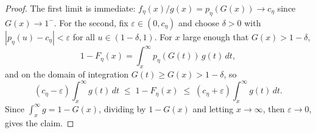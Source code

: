 \documentclass[10pt,a4paper]{amsart}
\begin{document}
\begin{proof}
The first limit is immediate: $f_\eta(x)/g(x)=p_\eta(G(x))\to c_\eta$
since $G(x)\to1^-$. For the second, fix $\varepsilon\in(0,c_\eta)$ and
choose $\delta>0$ with $|p_\eta(u)-c_\eta|<\varepsilon$ for all
$u\in(1-\delta,1)$. For $x$ large enough that $G(x)>1-\delta$,
\[
1-F_\eta(x)=\int_x^\infty p_\eta(G(t))\,g(t)\,dt,
\]
and on the domain of integration $G(t)\ge G(x)>1-\delta$, so
\[
(c_\eta-\varepsilon)\int_x^\infty g(t)\,dt
\;\le\;
1-F_\eta(x)
\;\le\;
(c_\eta+\varepsilon)\int_x^\infty g(t)\,dt .
\]
Since $\int_x^\infty g=1-G(x)$, dividing by $1-G(x)$ and letting
$x\to\infty$, then $\varepsilon\to0$, gives the claim.
\end{proof}
\end{document}
